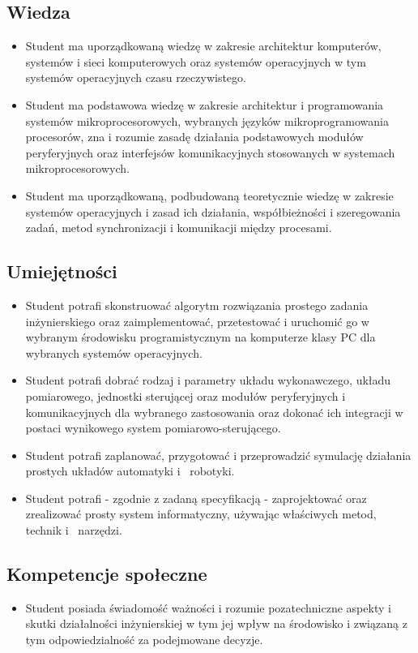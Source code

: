 \documentclass[12pt, a4paper]{article}
\begin{document}
\subsection*{Wiedza}
\begin{itemize}
  \item Student ma uporządkowaną wiedzę w zakresie architektur komputerów, systemów i sieci komputerowych oraz systemów operacyjnych w tym systemów operacyjnych czasu rzeczywistego.
  \item Student ma podstawowa wiedzę w zakresie architektur i programowania systemów mikroprocesorowych, wybranych języków mikroprogramowania procesorów, zna i rozumie zasadę działania podstawowych modułów peryferyjnych oraz interfejsów komunikacyjnych stosowanych w systemach mikroprocesorowych.
  \item Student ma uporządkowaną, podbudowaną teoretycznie wiedzę w zakresie systemów operacyjnych i zasad ich działania, współbieżności i szeregowania zadań, metod synchronizacji i komunikacji między procesami.
\end{itemize}

\subsection*{Umiejętności}
\begin{itemize}
  \item Student potrafi skonstruować algorytm rozwiązania prostego zadania inżynierskiego oraz zaimplementować, przetestować i uruchomić go w wybranym środowisku programistycznym na komputerze klasy PC dla wybranych systemów operacyjnych.
  \item Student potrafi dobrać rodzaj i parametry układu wykonawczego, układu pomiarowego, jednostki sterującej oraz modułów peryferyjnych i komunikacyjnych dla wybranego zastosowania oraz dokonać ich integracji w  postaci wynikowego system pomiarowo-sterującego.
  \item Student potrafi zaplanować, przygotować i przeprowadzić symulację działania prostych układów automatyki i  robotyki.
  \item Student potrafi - zgodnie z zadaną specyfikacją - zaprojektować oraz zrealizować prosty system informatyczny, używając właściwych metod, technik i  narzędzi.
\end{itemize}

\subsection*{Kompetencje społeczne}
\begin{itemize}
  \item Student posiada świadomość ważności i rozumie pozatechniczne aspekty i skutki działalności inżynierskiej w tym jej wpływ na środowisko i związaną z tym odpowiedzialność za podejmowane decyzje.
\end{itemize}
\end{document}
